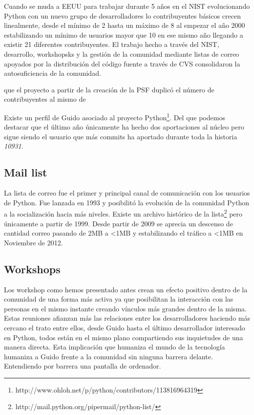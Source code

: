 \documentclass[11pt]{scrartcl}
\begin{document}
Cuando se muda a EEUU para trabajar durante 5 años en el NIST evolucionando Python con un nuevo grupo de desarrolladores lo contribuyentes básicos crecen linealmente, desde el mínimo de 2 hasta un máximo de 8 al empezar el año 2000 estabilizando un mínimo de usuarios mayor que 10 en ese mismo año llegando a existir 21 diferentes contribuyentes. El trabajo hecho a través del NIST, desarrollo, workshopsks y la gestión de la comunidad mediante listas de correo apoyados por la distribución del código fuente a través de CVS consolidaron la autosuficiencia de la comunidad.

que el proyecto a partir de la creación de la PSF duplicó el número de contribuyentes al mismo de 

Existe un perfil de Guido asociado al proyecto Python\footnote{http://www.ohloh.net/p/python/contributors/113816964319}. Del que podemos destacar que el último año únicamente ha hecho dos aportaciones al núcleo pero sigue siendo el usuario que más commits ha aportado durante toda la historia \emph{10931}.

\subsection{Mail list}\label{sec:maillist}

La lista de correo fue el primer y principal canal de comunicación con los usuarios de Python. Fue lanzada en 1993 y posibilitó la evolución de la comunidad Python a la socialización hacia más niveles. Existe un archivo histórico de la lista\footnote{http://mail.python.org/pipermail/python-list/} pero únicamente a partir de 1999. Desde partir de 2009 se aprecia un descenso de cantidad correo pasando de 2MB a <1MB y estabilizando el tráfico a <1MB en Noviembre de 2012.

\subsection{Workshops}\label{sec:workshops}

Los workshop como hemos presentado antes crean un efecto positivo dentro de la comunidad de una forma más activa ya que posibilitan la interacción con las personas en el mismo instante creando vínculos más grandes dentro de la misma. Estas reuniones afianzan más las relaciones entre los desarrolladores haciendo más cercano el trato entre ellos, desde Guido hasta el último desarrollador interesado en Python, todos están en el mismo plano compartiendo sus inquietudes de una manera directa. Esta implicación que humaniza el mundo de la tecnología humaniza a Guido frente a la comunidad sin ninguna barrera delante. Entendiendo por barrera una pantalla de ordenador.
\end{document}
